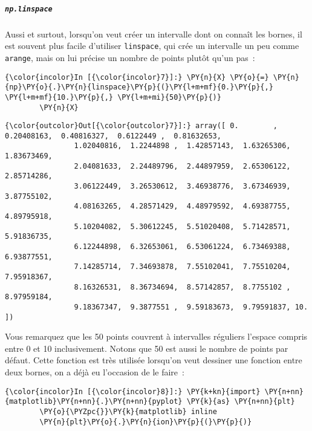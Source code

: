     \hypertarget{np.linspace}{%
\subparagraph{\texorpdfstring{\texttt{np.linspace}}{np.linspace}}\label{np.linspace}}

    Aussi et surtout, lorsqu'on veut créer un intervalle dont on connaît les
bornes, il est souvent plus facile d'utiliser \texttt{linspace}, qui
crée un intervalle un peu comme \texttt{arange}, mais on lui précise un
nombre de points plutôt qu'un pas~:

    \begin{Verbatim}[commandchars=\\\{\},frame=single,framerule=0.3mm,rulecolor=\color{cellframecolor}]
{\color{incolor}In [{\color{incolor}7}]:} \PY{n}{X} \PY{o}{=} \PY{n}{np}\PY{o}{.}\PY{n}{linspace}\PY{p}{(}\PY{l+m+mf}{0.}\PY{p}{,} \PY{l+m+mf}{10.}\PY{p}{,} \PY{l+m+mi}{50}\PY{p}{)}
        \PY{n}{X}
\end{Verbatim}


\begin{Verbatim}[commandchars=\\\{\},frame=single,framerule=0.3mm,rulecolor=\color{cellframecolor}]
{\color{outcolor}Out[{\color{outcolor}7}]:} array([ 0.        ,  0.20408163,  0.40816327,  0.6122449 ,  0.81632653,
                1.02040816,  1.2244898 ,  1.42857143,  1.63265306,  1.83673469,
                2.04081633,  2.24489796,  2.44897959,  2.65306122,  2.85714286,
                3.06122449,  3.26530612,  3.46938776,  3.67346939,  3.87755102,
                4.08163265,  4.28571429,  4.48979592,  4.69387755,  4.89795918,
                5.10204082,  5.30612245,  5.51020408,  5.71428571,  5.91836735,
                6.12244898,  6.32653061,  6.53061224,  6.73469388,  6.93877551,
                7.14285714,  7.34693878,  7.55102041,  7.75510204,  7.95918367,
                8.16326531,  8.36734694,  8.57142857,  8.7755102 ,  8.97959184,
                9.18367347,  9.3877551 ,  9.59183673,  9.79591837, 10.        ])
\end{Verbatim}
            
    Vous remarquez que les 50 points couvrent à intervalles réguliers
l'espace compris entre 0 et 10 inclusivement. Notons que 50 est aussi le
nombre de points par défaut. Cette fonction est très utilisée lorsqu'on
veut dessiner une fonction entre deux bornes, on a déjà eu l'occasion de
le faire~:

    \begin{Verbatim}[commandchars=\\\{\},frame=single,framerule=0.3mm,rulecolor=\color{cellframecolor}]
{\color{incolor}In [{\color{incolor}8}]:} \PY{k+kn}{import} \PY{n+nn}{matplotlib}\PY{n+nn}{.}\PY{n+nn}{pyplot} \PY{k}{as} \PY{n+nn}{plt}
        \PY{o}{\PYZpc{}}\PY{k}{matplotlib} inline
        \PY{n}{plt}\PY{o}{.}\PY{n}{ion}\PY{p}{(}\PY{p}{)}
\end{Verbatim}


